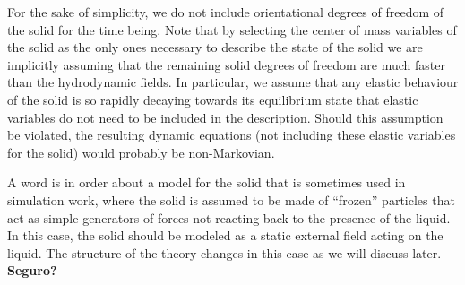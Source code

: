 \documentclass[b5paper,openright,11pt]{book}
\newcommand{\Note}[1]{{\bf \color{red}#1}}    %
\begin{document}
For the sake of simplicity, we do not include orientational degrees of
freedom of the  solid for the time being.  Note  that by selecting the
center of  mass variables of the  solid as the only  ones necessary to
describe the  state of the solid  we are implicitly assuming  that the
remaining  solid  degrees   of  freedom  are  much   faster  than  the
hydrodynamic  fields.   In  particular,  we assume  that  any  elastic
behaviour of the solid is  so rapidly decaying towards its equilibrium
state  that elastic  variables  do  not need  to  be  included in  the
description. Should this assumption be violated, the resulting dynamic
equations (not including  these elastic variables for the solid)
would probably  be non-Markovian.

A word is in order about a  model for the solid that is sometimes used
in  simulation work,  where the  solid  is  assumed to  be made  of
``frozen''  particles that  act  as simple  generators  of forces  not
reacting back  to the presence of  the liquid. In this  case, the solid
should be modeled as a static external field acting on the liquid. The
structure of the theory changes in this case as we will discuss later. \Note{Seguro?}
\end{document}
